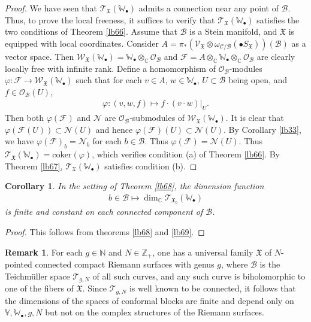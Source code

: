 \documentclass[12pt,b5paper,notitlepage]{report}
\theoremstyle{definition}
\newtheorem{rem}[df]{Remark}
\theoremstyle{plain}
\newtheorem{co}[df]{Corollary}
\newcommand{\fk}{\mathfrak}
\newcommand{\mc}{\mathcal}
\newcommand{\scr}{\mathscr}
\newcommand{\blt}{\bullet}
\newcommand{\coker}{\mathrm{coker}}
\newcommand{\Vbb}{\mathbb V}
\newcommand{\Wbb}{\mathbb W}
\newcommand{\Cbb}{\mathbb C}
\newcommand{\Nbb}{\mathbb N}
\newcommand{\Zbb}{\mathbb Z}
\numberwithin{equation}{section}
\begin{document}
\begin{proof}
We have seen that $\scr T_{\fk X}(\Wbb_\blt)$ admits a connection near any point of $\mc B$. Thus, to prove the local freeness, it suffices to verify that $\scr T_{\fk X}(\Wbb_\blt)$ satisfies the two conditions of Theorem \ref{lb66}. Assume that $\mc B$ is a Stein manifold, and $\fk X$ is equipped with local coordinates.  Consider  $A=\pi_*(\scr V_{\fk X}\otimes\omega_{\mc C/\mc B}(\blt S_{\fk X}))(\mc B)$ as a vector space. Then $\scr W_{\fk X}(\Wbb_\blt)=\Wbb_\blt\otimes_\Cbb\scr O_{\mc B}$ and $\scr F=A\otimes_\Cbb\Wbb_\blt\otimes_\Cbb\scr O_{\mc B}$ are clearly locally free with infinite rank. Define a homomorphism of $\scr O_{\mc B}$-modules $\varphi:\scr F\rightarrow\scr W_{\fk X}(\Wbb_\blt)$ such that for each $v\in A$, $w\in\Wbb_\blt$, $U\subset \mc B$ being open, and $f\in\scr O_{\mc B}(U)$,
\begin{align*}
\varphi: (v,w,f)\mapsto f\cdot(v\cdot w)|_U.
\end{align*}
Then both $\varphi(\scr F)$ and $\scr N$ are $\scr O_{\mc B}$-submodules of $\scr W_{\fk X}(\Wbb_\blt)$. It is clear that $\varphi(\scr F(U))\subset\scr N(U)$ and hence $\varphi(\scr F)(U)\subset\scr N(U)$. By Corollary \ref{lb33}, we have $\varphi(\scr F)_b=\scr N_b$ for each $b\in\mc B$. Thus $\varphi(\scr F)=\scr N(U)$. Thus $\scr T_{\fk X}(\Wbb_\blt)=\coker(\varphi)$, which verifies condition (a) of Theorem \ref{lb66}. By Theorem \ref{lb67}, $\scr T_{\fk X}(\Wbb_\blt)$ satisfies condition (b). 
\end{proof}




\begin{co}\label{lb119}
In the setting of Theorem \ref{lb68}, the dimension function
\begin{align*}
b\in\mc B\mapsto \dim_\Cbb\scr T_{\fk X_b}(\Wbb_\blt)
\end{align*}
is finite and  constant on each connected component of $\mc B$.
\end{co}

\begin{proof}
This follows from theorems \ref{lb68} and \ref{lb69}.
\end{proof}

\begin{rem}
For each $g\in\Nbb$ and $N\in\Zbb_+$, one has a universal family $\fk X$ of $N$-pointed connected   compact Riemann surfaces with genus $g$, where $\mc B$ is the Teichm\"uller space $\mc T_{g,N}$ of all such curves, and any such curve is biholomorphic to one of the fibers of $\fk X$. Since $\mc T_{g,N}$ is well known to be connected, it follows that the dimensions of the spaces of conformal blocks are finite and depend only on $\Vbb,\Wbb_\blt,g,N$ but not on the complex structures of the Riemann surfaces.
\end{rem}
\end{document}
